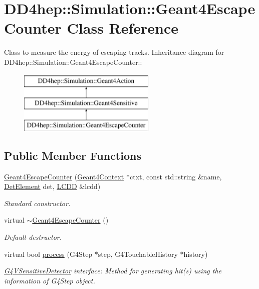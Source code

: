 \hypertarget{class_d_d4hep_1_1_simulation_1_1_geant4_escape_counter}{
\section{DD4hep::Simulation::Geant4EscapeCounter Class Reference}
\label{class_d_d4hep_1_1_simulation_1_1_geant4_escape_counter}
}


Class to measure the energy of escaping tracks.  
Inheritance diagram for DD4hep::Simulation::Geant4EscapeCounter::\begin{figure}[H]
\begin{center}
\leavevmode
\includegraphics[height=3cm]{class_d_d4hep_1_1_simulation_1_1_geant4_escape_counter}
\end{center}
\end{figure}
\subsection*{Public Member Functions}
\begin{DoxyCompactItemize}
\item 
\hyperlink{class_d_d4hep_1_1_simulation_1_1_geant4_escape_counter_a99f1af6fc1a64bf6add2abacd410d310}{Geant4EscapeCounter} (\hyperlink{class_d_d4hep_1_1_simulation_1_1_geant4_context}{Geant4Context} $\ast$ctxt, const std::string \&name, \hyperlink{class_d_d4hep_1_1_geometry_1_1_det_element}{DetElement} det, \hyperlink{class_d_d4hep_1_1_geometry_1_1_l_c_d_d}{LCDD} \&lcdd)
\begin{DoxyCompactList}\small\item\em Standard constructor. \item\end{DoxyCompactList}\item 
virtual \hyperlink{class_d_d4hep_1_1_simulation_1_1_geant4_escape_counter_a5bfa77ab4c12efbfc6e311dcf0cc2d6f}{$\sim$Geant4EscapeCounter} ()
\begin{DoxyCompactList}\small\item\em Default destructor. \item\end{DoxyCompactList}\item 
virtual bool \hyperlink{class_d_d4hep_1_1_simulation_1_1_geant4_escape_counter_a869bbe150025b9798af6ab7487d225de}{process} (G4Step $\ast$step, G4TouchableHistory $\ast$history)
\begin{DoxyCompactList}\small\item\em \hyperlink{class_g4_v_sensitive_detector}{G4VSensitiveDetector} interface: Method for generating hit(s) using the information of G4Step object. \item\end{DoxyCompactList}\end{DoxyCompactItemize}
